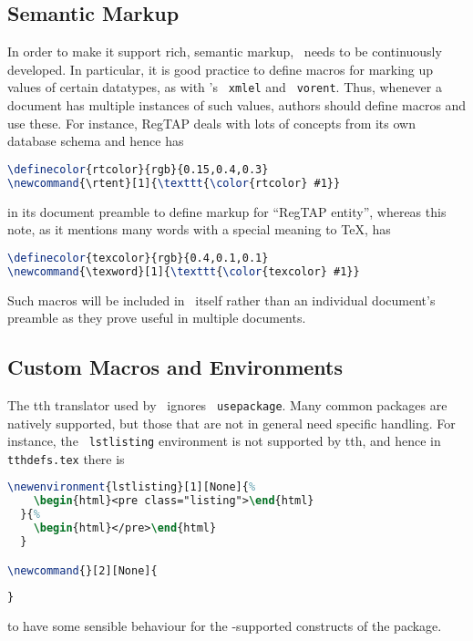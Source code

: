 \documentclass[11pt,a4paper]{ivoa}
\newcommand{\texword}[1]{\texttt{\color{texcolor} #1}}
\begin{document}
\subsection{Semantic Markup}

In order to make it support rich, semantic markup, \ivoatex\ needs to be
continuously developed.  In particular, it is good practice to define
macros for marking up values of certain datatypes, as with \ivoatex's
\texword{xmlel} and \texword{vorent}.  
Thus, whenever a document has multiple
instances of such values, authors should define macros and use these.
For instance, RegTAP deals with lots of concepts from its own
database schema and hence has
\begin{lstlisting}[language=TeX]
\definecolor{rtcolor}{rgb}{0.15,0.4,0.3}
\newcommand{\rtent}[1]{\texttt{\color{rtcolor} #1}}
\end{lstlisting}
in its document preamble to
define markup for ``RegTAP entity'', whereas
this note, as it mentions many words with a special meaning to \TeX, has
\begin{lstlisting}[language=TeX]
\definecolor{texcolor}{rgb}{0.4,0.1,0.1}
\newcommand{\texword}[1]{\texttt{\color{texcolor} #1}}
\end{lstlisting}
Such macros will be included in \ivoatex\ itself rather than an
individual document's preamble as they prove useful in multiple
documents.

\subsection{Custom Macros and Environments}

The tth translator used by \ivoatex\ ignores \texword{usepackage}.  Many
common packages are natively supported, but those that are not in
general need specific handling.  For instance, the \texword{lstlisting}
environment is not supported by tth, and hence in
\texttt{tthdefs.tex} there is
\begin{lstlisting}[language=TeX]
\newenvironment{lstlisting}[1][None]{%
    \begin{html}<pre class="listing">\end{html}
  }{%
    \begin{html}</pre>\end{html}
  }

\newcommand{}[2][None]{
  
}
\end{lstlisting}
to have some sensible behaviour for the \ivoatex-supported constructs of
the package.
\end{document}
